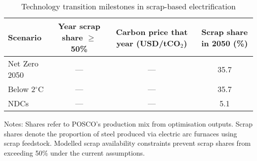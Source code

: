 \begin{table}[ht]
  \centering
  \caption{Technology transition milestones in scrap-based electrification}
  \label{tab:technology-thresholds}
  \begin{threeparttable}
  \begin{tabular}{@{}lccc@{}}
    \toprule
    Scenario & Year scrap share $\ge$50\% & Carbon price that year (USD/tCO$_2$) & Scrap share in 2050 (\%) \\
    \midrule
    Net Zero 2050 & --- & --- & 35.7 \\
    Below 2$^\circ$C & --- & --- & 35.7 \\
    NDCs & --- & --- & 5.1 \\
    \bottomrule
  \end{tabular}
  \begin{tablenotes}
    \footnotesize
    \item Notes: Shares refer to POSCO's production mix from optimisation outputs. Scrap shares denote the proportion of steel produced via electric arc furnaces using scrap feedstock. Modelled scrap availability constraints prevent scrap shares from exceeding 50\% under the current assumptions.
  \end{tablenotes}
  \end{threeparttable}
\end{table}

